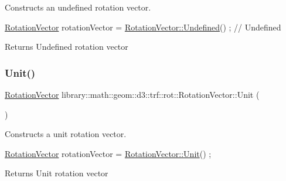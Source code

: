 Constructs an undefined rotation vector. 


\begin{DoxyCode}
\hyperlink{classlibrary_1_1math_1_1geom_1_1d3_1_1trf_1_1rot_1_1_rotation_vector_a49076a279f457fdb14c4a9d4d61e1738}{RotationVector} rotationVector = \hyperlink{classlibrary_1_1math_1_1geom_1_1d3_1_1trf_1_1rot_1_1_rotation_vector_a4ab50dc44c938485c102c4c70006c04b}{RotationVector::Undefined}() ; \textcolor{comment}{//
       Undefined}
\end{DoxyCode}


\begin{DoxyReturn}{Returns}
Undefined rotation vector 
\end{DoxyReturn}
\mbox{\label{classlibrary_1_1math_1_1geom_1_1d3_1_1trf_1_1rot_1_1_rotation_vector_ae8dcd99b54ffcffee6906b526a8d2769}} 
\subsubsection{\texorpdfstring{Unit()}{Unit()}}
{\footnotesize\ttfamily \hyperlink{classlibrary_1_1math_1_1geom_1_1d3_1_1trf_1_1rot_1_1_rotation_vector}{Rotation\+Vector} library\+::math\+::geom\+::d3\+::trf\+::rot\+::\+Rotation\+Vector\+::\+Unit (\begin{DoxyParamCaption}{ }\end{DoxyParamCaption})\hspace{0.3cm}{\ttfamily [static]}}



Constructs a unit rotation vector. 


\begin{DoxyCode}
\hyperlink{classlibrary_1_1math_1_1geom_1_1d3_1_1trf_1_1rot_1_1_rotation_vector_a49076a279f457fdb14c4a9d4d61e1738}{RotationVector} rotationVector = \hyperlink{classlibrary_1_1math_1_1geom_1_1d3_1_1trf_1_1rot_1_1_rotation_vector_ae8dcd99b54ffcffee6906b526a8d2769}{RotationVector::Unit}() ;
\end{DoxyCode}


\begin{DoxyReturn}{Returns}
Unit rotation vector 
\end{DoxyReturn}


